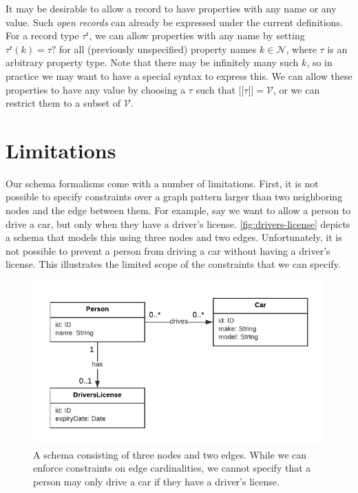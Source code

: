 \documentclass{article}
\newcommand{\ptype}{\tau}
\newcommand{\rtype}{\tau^\mathsf{r}}
\newcommand{\lsem}{\ensuremath{[\![}}
\newcommand{\rsem}{\ensuremath{]\!]}}
\newcommand{\sem}[1]{\ensuremath{\lsem #1 \rsem}}
\begin{document}
It may be desirable to allow a record to have properties with any name or any value. Such \emph{open records} can already be expressed under the current definitions. For a record type $\rtype$, we can allow properties with any name by setting $\rtype(k) = \ptype?$ for all (previously unspecified) property names $k \in \mathcal{N}$, where $\ptype$ is an arbitrary property type. Note that there may be infinitely many such $k$, so in practice we may want to have a special syntax to express this. We can allow these properties to have any value by choosing a $\ptype$ such that $\sem{\ptype} = \mathcal{V}$, or we can restrict them to a subset of $\mathcal{V}$.

\section{Limitations}

Our schema formalisms come with a number of limitations. First, it is not possible to specify constraints over a graph pattern larger than two neighboring nodes and the edge between them. For example, say we want to allow a person to drive a car, but only when they have a driver's license. \autoref{fig:drivers-license} depicts a schema that models this using three nodes and two edges. Unfortunately, it is not possible to prevent a person from driving a car without having a driver's license. This illustrates the limited scope of the constraints that we can specify.

\begin{figure}[t]
  \centering
  \includegraphics{figures/drivers-license.pdf}
  \caption{A schema consisting of three nodes and two edges. While we can enforce constraints on edge cardinalities, we cannot specify that a person may only drive a car if they have a driver's license.}
  \label{fig:drivers-license}
\end{figure}
\end{document}
